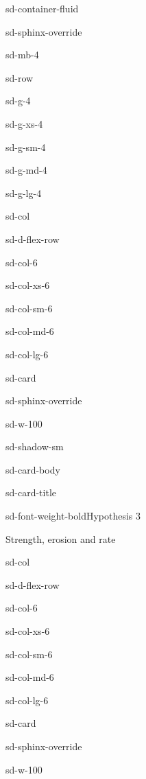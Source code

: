 \documentclass[letterpaper,10pt,english]{jupyterBook}
\let\sphinxpxdimen\pdfpxdimen\else\newdimen\sphinxpxdimen
\begin{document}
\begin{sphinxuseclass}{sd-container-fluid}
\begin{sphinxuseclass}{sd-sphinx-override}
\begin{sphinxuseclass}{sd-mb-4}
\begin{sphinxuseclass}{sd-row}
\begin{sphinxuseclass}{sd-g-4}
\begin{sphinxuseclass}{sd-g-xs-4}
\begin{sphinxuseclass}{sd-g-sm-4}
\begin{sphinxuseclass}{sd-g-md-4}
\begin{sphinxuseclass}{sd-g-lg-4}
\begin{sphinxuseclass}{sd-col}
\begin{sphinxuseclass}{sd-d-flex-row}
\begin{sphinxuseclass}{sd-col-6}
\begin{sphinxuseclass}{sd-col-xs-6}
\begin{sphinxuseclass}{sd-col-sm-6}
\begin{sphinxuseclass}{sd-col-md-6}
\begin{sphinxuseclass}{sd-col-lg-6}
\begin{sphinxuseclass}{sd-card}
\begin{sphinxuseclass}{sd-sphinx-override}
\begin{sphinxuseclass}{sd-w-100}
\begin{sphinxuseclass}{sd-shadow-sm}
\begin{sphinxuseclass}{sd-card-body}
\begin{sphinxuseclass}{sd-card-title}
\begin{sphinxuseclass}{sd-font-weight-bold}Hypothesis 3
\end{sphinxuseclass}
\end{sphinxuseclass}
\sphinxAtStartPar
Strength, erosion and rate

\noindent{\hspace*{\fill}\sphinxincludegraphics[width=200\sphinxpxdimen]{{wolfetal}.png}\hspace*{\fill}}

\sphinxAtStartPar
{}

\end{sphinxuseclass}
\end{sphinxuseclass}
\end{sphinxuseclass}
\end{sphinxuseclass}
\end{sphinxuseclass}
\end{sphinxuseclass}
\end{sphinxuseclass}
\end{sphinxuseclass}
\end{sphinxuseclass}
\end{sphinxuseclass}
\end{sphinxuseclass}
\end{sphinxuseclass}
\begin{sphinxuseclass}{sd-col}
\begin{sphinxuseclass}{sd-d-flex-row}
\begin{sphinxuseclass}{sd-col-6}
\begin{sphinxuseclass}{sd-col-xs-6}
\begin{sphinxuseclass}{sd-col-sm-6}
\begin{sphinxuseclass}{sd-col-md-6}
\begin{sphinxuseclass}{sd-col-lg-6}
\begin{sphinxuseclass}{sd-card}
\begin{sphinxuseclass}{sd-sphinx-override}
\begin{sphinxuseclass}{sd-w-100}

\end{sphinxuseclass}
\end{sphinxuseclass}
\end{sphinxuseclass}
\end{sphinxuseclass}
\end{sphinxuseclass}
\end{sphinxuseclass}
\end{sphinxuseclass}
\end{sphinxuseclass}
\end{sphinxuseclass}
\end{sphinxuseclass}
\end{sphinxuseclass}
\end{sphinxuseclass}
\end{sphinxuseclass}
\end{sphinxuseclass}
\end{sphinxuseclass}
\end{sphinxuseclass}
\end{sphinxuseclass}
\end{sphinxuseclass}
\end{sphinxuseclass}
\end{document}
